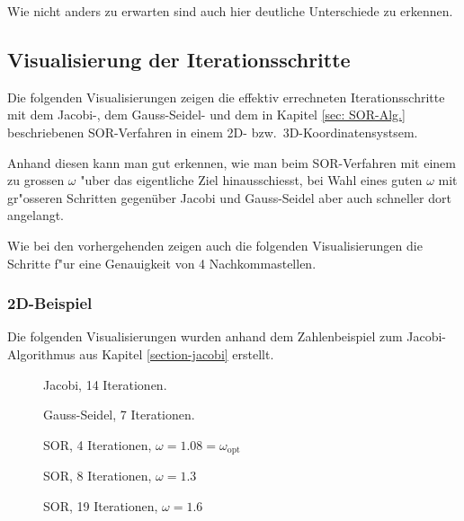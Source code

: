 \begin{refsection}
Wie nicht anders zu erwarten sind auch hier deutliche Unterschiede zu erkennen.
		
\subsection{Visualisierung der Iterationsschritte}
Die folgenden Visualisierungen zeigen die effektiv errechneten
Iterationsschritte mit dem Jacobi-, dem Gauss-Seidel- und dem in
Kapitel \ref{sec: SOR-Alg.} beschriebenen SOR-Verfahren in einem 2D-
bzw.~3D-Koordinatensystsem.

Anhand diesen kann man gut erkennen, wie man beim SOR-Verfahren mit
einem zu grossen $\omega$ "uber das eigentliche Ziel hinausschiesst,
bei Wahl eines guten $\omega$ mit gr"osseren Schritten gegenüber Jacobi
und Gauss-Seidel aber auch schneller dort angelangt.

Wie bei den vorhergehenden zeigen auch die folgenden Visualisierungen
die Schritte f"ur eine Genauigkeit von 4 Nachkommastellen.
			
\subsubsection{2D-Beispiel}
Die folgenden Visualisierungen wurden anhand dem Zahlenbeispiel zum
Jacobi-Algorithmus aus Kapitel \ref{section-jacobi} erstellt.
\begin{figure}[!ht]\centering
\caption{Jacobi, 14 Iterationen.}
\label{fig:Jac. 2D Bsp}
\end{figure}
\begin{figure}[!ht]\centering
\caption{Gauss-Seidel, 7 Iterationen.}
\label{fig:G.-S. 2D Bsp}
\end{figure}
\begin{figure}[!ht]\centering
\caption{SOR, 4 Iterationen, $\omega=1.08=\omega_{\text{opt}}$}
\label{fig:SOR w=1.08= 2D Bsp}
\end{figure}

\begin{figure}[!ht]\centering
\caption{SOR, 8 Iterationen, $\omega=1.3$}
\label{fig:SOR w=1.3 2D Bsp}
\end{figure}
\begin{figure}[!ht]\centering
\caption{SOR, 19 Iterationen, $\omega=1.6$}
\label{fig:SOR w=1.6 2D Bsp}
\end{figure}
	

\end{refsection}

